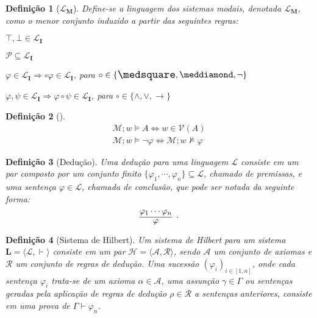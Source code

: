 \documentclass{report}
\newtheorem{definition}{Definição}
\begin{document}
    \begin{definition}[$\mathcal{L}_\mathbf{M}$]
        Define-se a linguagem dos sistemas modais, denotada $\mathcal{L}_\mathbf{M}$, como o menor conjunto induzido a partir das seguintes regras:
        
        $\top, \bot \in \mathcal{L}_\mathbf{I}$
        
        $\mathcal{P} \subseteq \mathcal{L}_\mathbf{I}$
        
        $\varphi \in \mathcal{L}_\mathbf{I} \Rightarrow \circ \varphi \in \mathcal{L}_\mathbf{I}$, para $\circ \in \{\nec, \pos, \neg\}$

        $\varphi, \psi \in \mathcal{L}_\mathbf{I} \Rightarrow \varphi \circ \psi \in \mathcal{L}_\mathbf{I}$, para $\circ \in \{\wedge, \vee, \to\}$
    \end{definition}

    \begin{definition}[]
        \begin{align}
            \mathcal{M}; \mathit{w} \vDash A \Leftrightarrow \mathit{w} \in \mathcal{V}(A) \\
            \mathcal{M}; \mathit{w} \vDash \neg \varphi \Leftrightarrow \mathcal{M}; \mathit{w} \nvDash \varphi
        \end{align}
    \end{definition}


    \begin{definition}[Dedução]
        Uma dedução para uma linguagem $\mathcal{L}$ consiste em um par composto por um conjunto finito $\{\varphi_1, \cdots, \varphi_n\} \subseteq \mathcal{L}$, chamado de \emph{premissas}, e uma sentença $\varphi \in \mathcal{L}$, chamada de \emph{conclusão}, que pode ser notada da seguinte forma: $$\infer[.]{\varphi}{\varphi_1 \cdots \varphi_n}$$
    \end{definition}

    \begin{definition}[Sistema de Hilbert]
        Um sistema de Hilbert para um sistema $\mathbf{L} = \langle \mathcal{L}, \vdash\rangle$ consiste em um par $\mathcal{H} = \langle \mathcal{A}, \mathcal{R} \rangle$, sendo $\mathcal{A}$ um conjunto de axiomas e $\mathcal{R}$ um conjunto de regras de dedução. Uma sucessão $(\varphi_i)_{i\in[1,n]}$, onde cada sentença $\varphi_i$ trata-se de um axioma $\alpha \in \mathcal{A}$, uma assunção $\gamma \in \Gamma$ ou sentenças geradas pela aplicação de regras de dedução $\rho \in \mathcal{R}$ a sentenças anteriores, consiste em uma prova de $\Gamma \vdash \varphi_n$.
    \end{definition}
\end{document}
